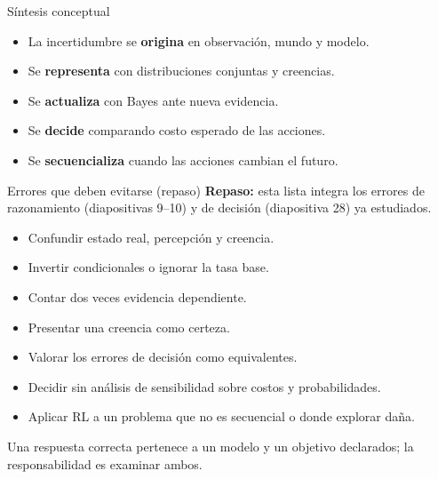 \documentclass[aspectratio=169,10pt]{beamer}
\newcommand{\concepto}[1]{\textcolor{UAPTeal}{\textbf{#1}}}
\newcommand{\br}{\\}
\begin{document}
\begin{frame}{Síntesis conceptual}
  \small
  \begin{center}
  \end{center}
  \vfill
  \begin{itemize}
    \item La incertidumbre se \concepto{origina} en observación, mundo y modelo.
    \item Se \concepto{representa} con distribuciones conjuntas y creencias.
    \item Se \concepto{actualiza} con Bayes ante nueva evidencia.
    \item Se \concepto{decide} comparando costo esperado de las acciones.
    \item Se \concepto{secuencializa} cuando las acciones cambian el futuro.
  \end{itemize}
\end{frame}

\begin{frame}{Errores que deben evitarse (repaso)}
  \small
  \concepto{Repaso:} esta lista integra los errores de razonamiento (diapositivas 9--10) y de decisión (diapositiva 28) ya estudiados.
  \begin{itemize}
    \item Confundir estado real, percepción y creencia.
    \item Invertir condicionales o ignorar la tasa base.
    \item Contar dos veces evidencia dependiente.
    \item Presentar una creencia como certeza.
    \item Valorar los errores de decisión como equivalentes.
    \item Decidir sin análisis de sensibilidad sobre costos y probabilidades.
    \item Aplicar RL a un problema que no es secuencial o donde explorar daña.
  \end{itemize}
  \vfill
  \alert{Una respuesta correcta pertenece a un modelo y un objetivo declarados; la responsabilidad es examinar ambos.}
\end{frame}
\end{document}
